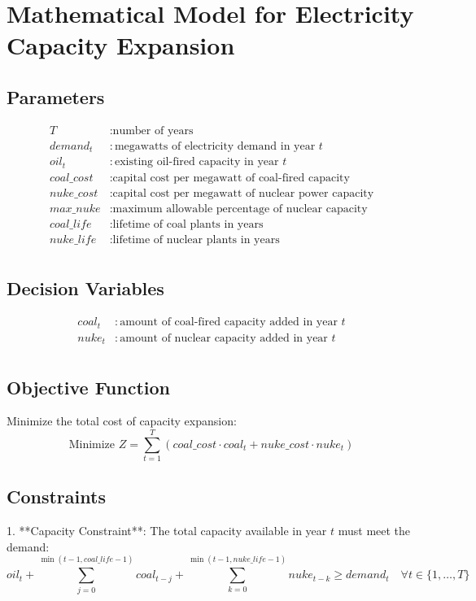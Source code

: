 \documentclass{article}
\begin{document}
\section*{Mathematical Model for Electricity Capacity Expansion}

\subsection*{Parameters}
\begin{align*}
T & : \text{number of years} \\
demand_t & : \text{megawatts of electricity demand in year } t \\
oil_t & : \text{existing oil-fired capacity in year } t \\
coal\_cost & : \text{capital cost per megawatt of coal-fired capacity} \\
nuke\_cost & : \text{capital cost per megawatt of nuclear power capacity} \\
max\_nuke & : \text{maximum allowable percentage of nuclear capacity} \\
coal\_life & : \text{lifetime of coal plants in years} \\
nuke\_life & : \text{lifetime of nuclear plants in years} \\
\end{align*}

\subsection*{Decision Variables}
\begin{align*}
coal_t & : \text{amount of coal-fired capacity added in year } t \\
nuke_t & : \text{amount of nuclear capacity added in year } t \\
\end{align*}

\subsection*{Objective Function}
Minimize the total cost of capacity expansion:
\[
\text{Minimize } Z = \sum_{t=1}^{T} \left( coal\_cost \cdot coal_t + nuke\_cost \cdot nuke_t \right)
\]

\subsection*{Constraints}
1. **Capacity Constraint**:
   The total capacity available in year \( t \) must meet the demand:
   \[
   oil_t + \sum_{j=0}^{\min(t-1, coal\_life-1)} coal_{t-j} + \sum_{k=0}^{\min(t-1, nuke\_life-1)} nuke_{t-k} \geq demand_t \quad \forall t \in \{1, \ldots, T\}
   \]
\end{document}
